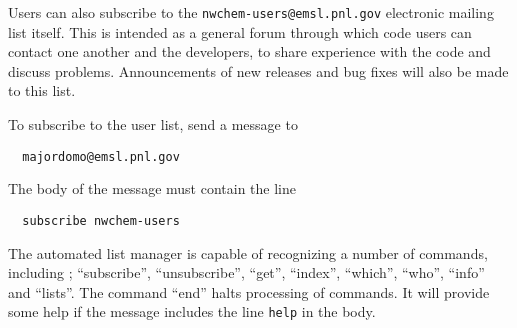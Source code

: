 Users can also subscribe to the {\tt nwchem-users@emsl.pnl.gov}
electronic mailing list itself.  
This is intended as a general forum through which code
users can contact one another and the developers, to share experience
with the code and discuss problems.  Announcements of new releases and
bug fixes will also be made to this list. 

To subscribe to the user list, send a message to 
\begin{verbatim}
  majordomo@emsl.pnl.gov
\end{verbatim}
The body of the message must contain the line 
\begin{verbatim}
  subscribe nwchem-users
\end{verbatim}

The automated list manager is capable of recognizing a number of
commands, including ; ``subscribe'', ``unsubscribe'', ``get'', ``index'',
``which'', ``who'', ``info'' and ``lists''.  The command ``end'' halts
processing of commands.  It will provide some help if the message
includes the line {\tt help} in the body.  



